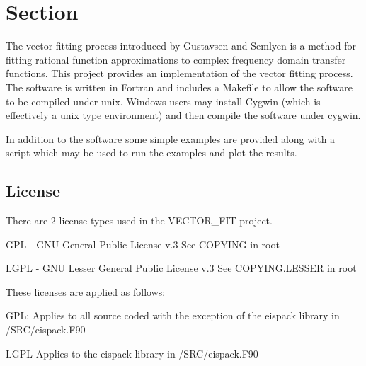 \section{Section}\label{introduction}

The vector fitting process introduced by Gustavsen and Semlyen \cite{vfit1} is a method for fitting rational function approximations to complex frequency domain transfer functions.
This project provides an implementation of the vector fitting process. The software is written in Fortran and includes a Makefile to allow the software to be compiled under unix. Windows users may install Cygwin (which is effectively a unix type environment) and then compile the software under cygwin. 

In addition to the software some simple examples are provided along with a script which may be used to run the examples and plot the results.  

\subsection{License}

There are 2 license types used in the VECTOR\_FIT project.

GPL - GNU General Public License v.3
See COPYING in root

LGPL - GNU Lesser General Public License v.3
See COPYING.LESSER in root

These licenses are applied as follows:

GPL: 
Applies to all source coded with the exception of the eispack library in /SRC/eispack.F90

LGPL
Applies to the eispack library in /SRC/eispack.F90

